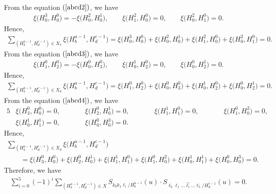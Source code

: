 \documentclass[pdftex]{sigma}
\numberwithin{equation}{section}
\begin{document}
\begin{Example}
\begin{gather*}
\end{gather*}
From the equation $(\ref{abcd2})$, we have
\begin{gather*}
\xi\bigl(H^{3}_{0},H^{0}_{0}\bigr)=-\xi\bigl(H^{2}_{0},H^{1}_{0}\bigr),\qquad \xi\bigl(H^{2}_{1},H^{0}_{0}\bigr)=0,\qquad \xi\bigl(H^{2}_{0},H^{0}_{1}\bigr)=0.
\end{gather*}
Hence,
\begin{gather*}
\sum_{(H^{a-1}_{b},H^{c-1}_{d})\in X_7}\xi\bigl(H^{a-1}_{b},H^{c-1}_{d}\bigr)=\xi\bigl(H^{3}_{0},H^{0}_{0}\bigr)+\xi\bigl(H^{2}_{0},H^{1}_{0}\bigr)+\xi\bigl(H^{2}_{1},H^{0}_{0}\bigr)+\xi\bigl(H^{2}_{0},H^{0}_{1}\bigr)=0.
\end{gather*}
From the equation $(\ref{abcd3})$, we have
\begin{gather*}
\xi\bigl(H^{0}_{1},H^{0}_{2}\bigr)=-\xi\bigl(H^{0}_{0},H^{0}_{3}\bigr),\qquad \xi\bigl(H^{1}_{0},H^{0}_{2}\bigr)=0,\qquad \xi\bigl(H^{0}_{0},H^{1}_{2}\bigr)=0.
\end{gather*}
Hence,
\begin{gather*}
\sum_{(H^{a-1}_{b},H^{c-1}_{d})\in X_8}\xi\bigl(H^{a-1}_{b},H^{c-1}_{d}\bigr)=\xi\bigl(H^{0}_{1},H^{0}_{2}\bigr)+\xi\bigl(H^{0}_{0}, H^{0}_{3}\bigr)+\xi\bigl(H^{1}_{0},H^{0}_{2}\bigr)+\xi\bigl(H^{0}_{0},H^{1}_{2}\bigr)=0.
\end{gather*}
From the equation $(\ref{abcd4})$, we have
\begin{alignat*}{5}
&\xi\bigl(H^{0}_{3},H^{0}_{0}\bigr)=0,\qquad&& \xi\bigl(H^{0}_{2},H^{1}_{0}\bigr)=0,\qquad&& \xi\bigl(H^{1}_{1},H^{0}_{1}\bigr)=0,\qquad&& \xi\bigl(H^{0}_{1},H^{2}_{0}\bigr)=0,& \\
&\xi\bigl(H^{1}_{0},H^{1}_{1}\bigr)=0,\qquad&& \xi\bigl(H^{0}_{0},H^{3}_{0}\bigr)=0.&
\end{alignat*}
Hence,
\begin{gather*}
\sum_{(H^{a-1}_{b},H^{c-1}_{d})\in X_9}\xi\bigl(H^{a-1}_{b},H^{c-1}_{d}\bigr)\\
\qquad{}=\xi\bigl(H^{0}_{3},H^{0}_{0}\bigr)+\xi\bigl(H^{0}_{2},H^{1}_{0}\bigr)+\xi\bigl(H^{1}_{1},H^{0}_{1}\bigr)+\xi\bigl(H^{0}_{1},H^{2}_{0}\bigr)+\xi\bigl(H^{1}_{0},H^{1}_{1}\bigr)+\xi\bigl(H^{0}_{0},H^{3}_{0}\bigr)=0.
\end{gather*}
Therefore, we have
\begin{gather*}
\sum_{i=0}^{5}{(-1)}^{i}\sum_{(H^{a-1}_{b},H^{c-1}_{d})\in X}S_{k_0 k_1 \ell_i/H^{a-1}_{b}}(u)\cdot S_{\ell_0 \ell_1 \dots \widehat{\ell_i} \dots \ell_{5}/H^{c-1}_{d}}(u)=0.
\end{gather*}
\end{Example}
\end{document}
